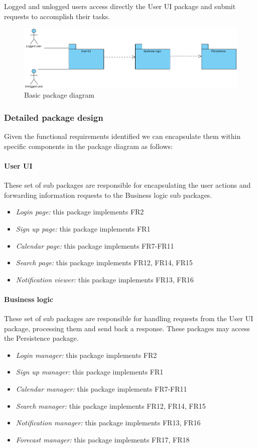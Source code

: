 \documentclass[10pt,a4paper,titlepage]{article}
\begin{document}
Logged and unlogged users access directly the User UI package and submit requests to accomplish their tasks.

\begin{figure}[h!]
\centering
\includegraphics[width=\linewidth]{./images/basic-package}
\caption[Basic package]{Basic package diagram}
\label{fig:basic-package}
\end{figure}

\subsubsection{Detailed package design}
Given the functional requirements identified we can encapsulate them within specific components in the package diagram as follows:

\paragraph{User UI}
These set of sub packages are responsible for encapsulating the user actions and forwarding information requests to the Business logic sub packages.
\begin{itemize}
\item \emph{Login page:} this package implements FR2
\item \emph{Sign up page:} this package implements FR1
\item \emph{Calendar page:} this package implements FR7-FR11
\item \emph{Search page:} this package implements FR12, FR14, FR15
\item \emph{Notification viewer:} this package implements FR13, FR16
\end{itemize}

\paragraph{Business logic}
These set of sub packages are responsible for handling requests from the User UI package, processing them and send back a response. These packages may access the Persistence package.
\begin{itemize}
\item \emph{Login manager:} this package implements FR2
\item \emph{Sign up manager:} this package implements FR1
\item \emph{Calendar manager:} this package implements FR7-FR11
\item \emph{Search manager:} this package implements FR12, FR14, FR15
\item \emph{Notification manager:} this package implements FR13, FR16
\item \emph{Forecast manager:} this package implements FR17, FR18
\end{itemize}
\end{document}

